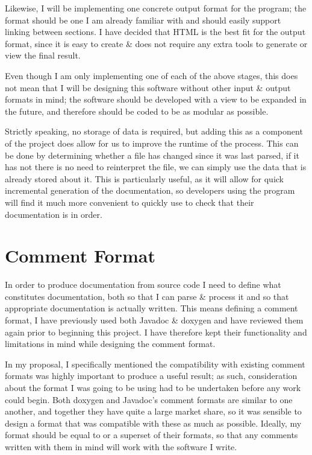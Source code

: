 Likewise, I will be implementing one concrete output format for the program; the
format should be one I am already familiar with and should easily support
linking between sections. I have decided that HTML is the best fit for the
output format, since it is easy to create \& does not require any extra tools to
generate or view the final result.

Even though I am only implementing one of each of the above stages, this does
not mean that I will be designing this software without other input \& output
formats in mind; the software should be developed with a view to be expanded in
the future, and therefore should be coded to be as modular as possible.

Strictly speaking, no storage of data is required, but adding this as a
component of the project does allow for us to improve the runtime of the
process. This can be done by determining whether a file has changed since it was
last parsed, if it has not there is no need to reinterpret the file, we can
simply use the data that is already stored about it. This is particularly
useful, as it will allow for quick incremental generation of the documentation,
so developers using the program will find it much more convenient to quickly use
to check that their documentation is in order.

\section{Comment Format}
In order to produce documentation from source code I need to define what
constitutes documentation, both so that I can parse \& process it and so that
appropriate documentation is actually written. This means defining a comment
format, I have previously used both Javadoc \& doxygen and have reviewed them
again prior to beginning this project. I have therefore kept their functionality
and limitations in mind while designing the comment format.

In my proposal, I specifically mentioned the compatibility with existing comment
formats was highly important to produce a useful result; as such, consideration
about the format I was going to be using had to be undertaken before any work
could begin. Both doxygen and Javadoc's comment formats are similar to one
another, and together they have quite a large market share, so it was sensible
to design a format that was compatible with these as much as possible. Ideally,
my format should be equal to or a superset of their formats, so that any
comments written with them in mind will work with the software I write.

